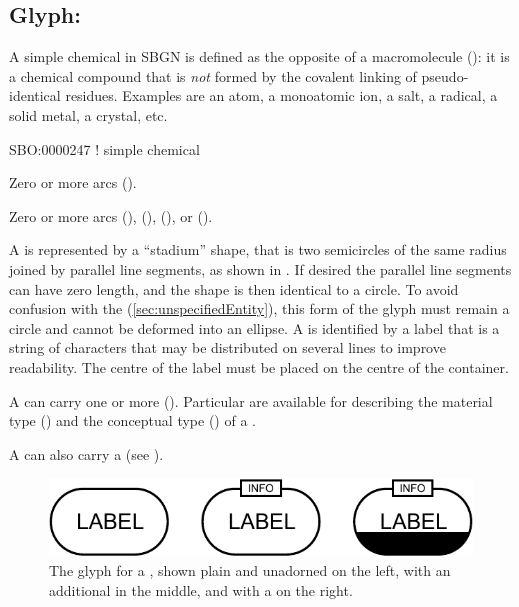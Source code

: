 \subsection{Glyph: }
\label{sec:simpleChemical}

A simple chemical in SBGN is defined as the opposite of a macromolecule (): it is a chemical compound that is \emph{not} formed by the covalent linking of pseudo-identical residues. 
Examples  are an atom, a monoatomic ion, a salt, a radical, a solid metal, a crystal, etc.

\begin{glyphDescription}

\glyphSboTerm
SBO:0000247 ! simple chemical


\glyphIncoming
Zero or more  arcs ().



\glyphOutgoing
Zero or more  arcs (),  (),  (), or  ().


\glyphContainer
A  is represented by a ``stadium'' shape, that is two semicircles of the same radius joined by parallel line segments, as shown in .
If desired the parallel line segments can have zero length, and the shape is then identical to a circle.
To avoid confusion with the  (\ref{sec:unspecifiedEntity}), this form of the glyph must remain a circle and cannot be deformed into an ellipse.
\glyphLabel
A  is identified by a label  that is a string of characters that may be distributed on several lines to improve readability.
The centre of the label must be placed on the centre of the container.


\glyphAux
A  can carry one or more  ().
Particular  are available for describing the material type () and the conceptual type () of a .

A  can also carry a  (see ).

\end{glyphDescription}

\begin{figure}[H]
  \centering
  \includegraphics{images/simple_chemical-combined}
  \caption{The \PD glyph for a , shown plain and unadorned on the left, with an additional  in the middle, and with a  on the right.}
  \label{fig:simpleChemical}
\end{figure}

